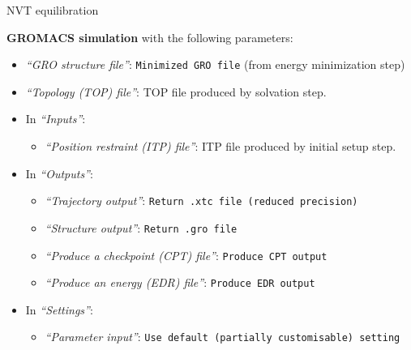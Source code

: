 \documentclass[twocolumn]{bmcart}%
\providecommand{\tightlist}{%
  \setlength{\itemsep}{0pt}\setlength{\parskip}{0pt}}
\begin{document}
\begin{handson_box_colour}{NVT
equilibration}


  \textbf{GROMACS simulation} with the following parameters:

  \begin{itemize}
  \tightlist
  \item
    \emph{``GRO structure file''}: \texttt{Minimized\ GRO\ file} (from
    energy minimization step)
  \item
    \emph{``Topology (TOP) file''}: TOP file produced by solvation step.
  \item
    In \emph{``Inputs''}:

    \begin{itemize}
    \tightlist
    \item
      \emph{``Position restraint (ITP) file''}: ITP file produced by
      initial setup step.
    \end{itemize}
  \item
    In \emph{``Outputs''}:

    \begin{itemize}
    \tightlist
    \item
      \emph{``Trajectory output''}:
      \texttt{Return\ .xtc\ file\ (reduced\ precision)}
    \item
      \emph{``Structure output''}: \texttt{Return\ .gro\ file}
    \item
      \emph{``Produce a checkpoint (CPT) file''}:
      \texttt{Produce\ CPT\ output}
    \item
      \emph{``Produce an energy (EDR) file''}:
      \texttt{Produce\ EDR\ output}
    \end{itemize}
  \item
    In \emph{``Settings''}:

    \begin{itemize}
    \tightlist
    \item
      \emph{``Parameter input''}:
      \texttt{Use\ default\ (partially\ customisable)\ setting}


\end{itemize}
\end{itemize}
\end{handson_box_colour}
\end{document}
